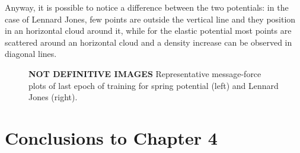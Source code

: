 \documentclass[../../master_thesis_np.tex]{subfiles}
\begin{document}

Anyway, it is possible to notice a difference between the two potentials: in the case of Lennard Jones, few points are outside the vertical line and they position in an horizontal cloud around it, while for the elastic potential most points are scattered around an horizontal cloud and a density increase can be observed in diagonal lines.

\begin{figure}[tp]
	\centering
	\caption{\textbf{NOT DEFINITIVE IMAGES} Representative message-force plots of last epoch of training for spring potential (left) and Lennard Jones (right).}
	\label{fig:lincomb_last}
\end{figure}


\section{Conclusions to Chapter 4}
\end{document}
